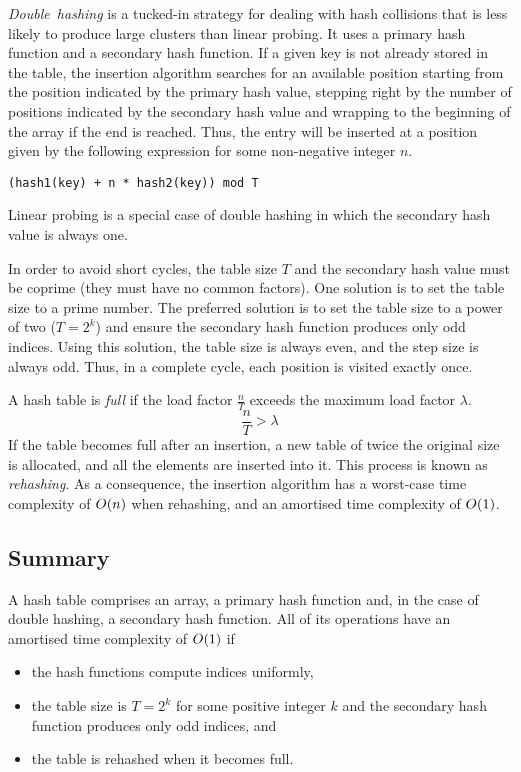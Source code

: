 \emph{Double~hashing} is a tucked-in strategy for dealing with hash collisions that is less likely to produce large clusters than linear probing.
It uses a primary hash function and a secondary hash function.
If a given key is not already stored in the table, the insertion algorithm searches for an available position starting from the position indicated by the primary hash value, stepping right by the number of positions indicated by the secondary hash value and wrapping to the beginning of the array if the end is reached.
Thus, the entry will be inserted at a position given by the following expression for some non-negative integer \( n \).
\begin{lstlisting}[mathescape=true]
(hash1(key) + n * hash2(key)) mod T
\end{lstlisting}
Linear probing is a special case of double hashing in which the secondary hash value is always one.

In order to avoid short cycles, the table size \( T \) and the secondary hash value must be coprime (they must have no common factors).
One solution is to set the table size to a prime number.
The preferred solution is to set the table size to a power of two (\( T = 2^{k} \)) and ensure the secondary hash function produces only odd indices.
Using this solution, the table size is always even, and the step size is always odd.
Thus, in a complete cycle, each position is visited exactly once.

A hash table is \emph{full} if the load factor \( \frac{n}{T} \) exceeds the maximum load factor \( \lambda \).
\begin{equation*}
  \frac{n}{T} > \lambda
\end{equation*}
If the table becomes full after an insertion, a new table of twice the original size is allocated, and all the elements are inserted into it.
This process is known as \emph{rehashing}.
As a consequence, the insertion algorithm has a worst-case time complexity of \( O\!\left(n\right) \) when rehashing, and an amortised time complexity of \( O\!\left(1\right) \).

\subsection{Summary}

A hash table comprises an array, a primary hash function and, in the case of double hashing, a secondary hash function.
All of its operations have an amortised time complexity of \( O\!\left(1\right) \) if
\begin{itemize}
  \item the hash functions compute indices uniformly,
  \item the table size is \( T = 2^{k} \) for some positive integer \( k \) and the secondary hash function produces only odd indices, and
  \item the table is rehashed when it becomes full.
\end{itemize}

